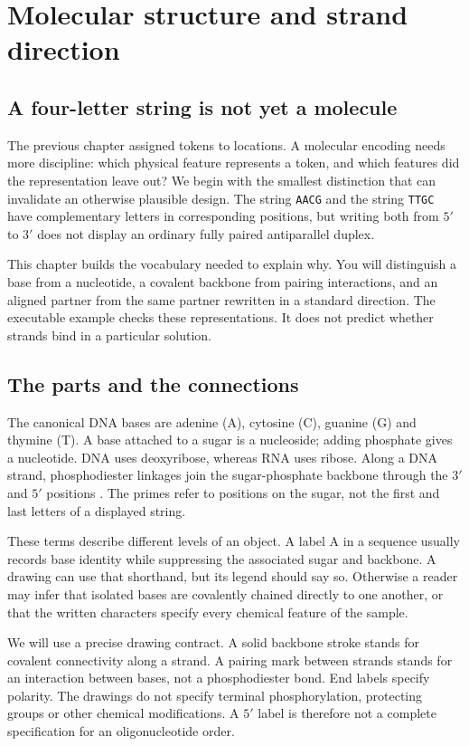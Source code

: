 \chapter{Molecular structure and strand direction}
\label{ch:structure}

\section*{A four-letter string is not yet a molecule}
The previous chapter assigned tokens to locations. A molecular encoding needs
more discipline: which physical feature represents a token, and which features
did the representation leave out? We begin with the smallest distinction that
can invalidate an otherwise plausible design. The string \texttt{AACG} and the
string \texttt{TTGC} have complementary letters in corresponding positions,
but writing both from $5'$ to $3'$ does not display an ordinary fully paired
antiparallel duplex.

This chapter builds the vocabulary needed to explain why. You will distinguish
a base from a nucleotide, a covalent backbone from pairing interactions, and
an aligned partner from the same partner rewritten in a standard direction.
The executable example checks these representations. It does not predict
whether strands bind in a particular solution.

\section{The parts and the connections}
The canonical DNA bases are adenine (A), cytosine (C), guanine (G) and thymine
(T). A base attached to a sugar is a nucleoside; adding phosphate gives a
nucleotide. DNA uses deoxyribose, whereas RNA uses ribose. Along a DNA strand,
phosphodiester linkages join the sugar-phosphate backbone through the $3'$ and
$5'$ positions \citep{cooper2000composition}. The primes refer to positions
on the sugar, not the first and last letters of a displayed string.

These terms describe different levels of an object. A label A in a sequence
usually records base identity while suppressing the associated sugar and
backbone. A drawing can use that shorthand, but its legend should say so.
Otherwise a reader may infer that isolated bases are covalently chained
directly to one another, or that the written characters specify every chemical
feature of the sample.

We will use a precise drawing contract. A solid backbone stroke stands for
covalent connectivity along a strand. A pairing mark between strands stands
for an interaction between bases, not a phosphodiester bond. End labels specify
polarity. The drawings do not specify terminal phosphorylation, protecting
groups or other chemical modifications. A $5'$ label is therefore not a
complete specification for an oligonucleotide order.

